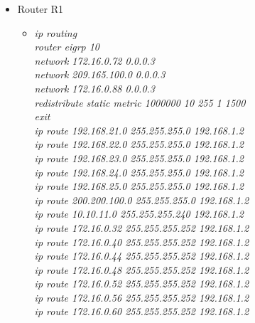 \documentclass[a4paper, 12pt]{article}
\begin{document}
\begin{itemize}
\begin{itemize}
\begin{itemize}
          \end{itemize}
           \item Router R1
        \begin{itemize}
         \item \textit{ip routing\\
                        router eigrp 10\\
                        network 172.16.0.72 0.0.0.3\\
                        network 209.165.100.0 0.0.0.3\\
                        network 172.16.0.88 0.0.0.3\\
                        redistribute static metric 1000000 10 255 1 1500\\
                        exit\\
                        ip route 192.168.21.0 255.255.255.0 192.168.1.2\\
                        ip route 192.168.22.0 255.255.255.0 192.168.1.2\\
                        ip route 192.168.23.0 255.255.255.0 192.168.1.2\\
                        ip route 192.168.24.0 255.255.255.0 192.168.1.2\\
                        ip route 192.168.25.0 255.255.255.0 192.168.1.2\\
                        ip route 200.200.100.0 255.255.255.0 192.168.1.2\\
                        ip route 10.10.11.0 255.255.255.240 192.168.1.2\\
                        ip route 172.16.0.32 255.255.255.252 192.168.1.2\\
                        ip route 172.16.0.40 255.255.255.252 192.168.1.2\\
                        ip route 172.16.0.44 255.255.255.252 192.168.1.2\\
                        ip route 172.16.0.48 255.255.255.252 192.168.1.2\\
                        ip route 172.16.0.52 255.255.255.252 192.168.1.2\\
                        ip route 172.16.0.56 255.255.255.252 192.168.1.2\\
                        ip route 172.16.0.60 255.255.255.252 192.168.1.2\\}
         

\end{itemize}
\end{itemize}
\end{itemize}
\end{document}
